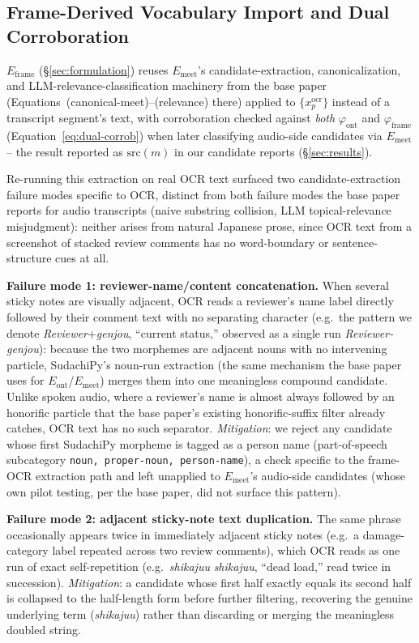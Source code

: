 ﻿\documentclass[twocolumn]{article}
\begin{document}
\subsection{Frame-Derived Vocabulary Import and Dual Corroboration}
\label{sec:method-frame-import}

$E_{\text{frame}}$ (\S\ref{sec:formulation}) reuses $E_{\text{meet}}$'s candidate-extraction,
canonicalization, and LLM-relevance-classification machinery from the base paper
(Equations~(canonical-meet)--(relevance) there) applied to $\{x^{\text{ocr}}_p\}$ instead of a
transcript segment's text, with corroboration checked against \emph{both} $\varphi_{\text{ont}}$ and
$\varphi_{\text{frame}}$ (Equation~\ref{eq:dual-corrob}) when later classifying audio-side
candidates via $E_{\text{meet}}$ -- the result reported as $\mathrm{src}(m)$ in our candidate
reports (\S\ref{sec:results}).

Re-running this extraction on real OCR text surfaced two candidate-extraction failure modes
specific to OCR, distinct from both failure modes the base paper reports for
audio transcripts (naive substring collision, LLM topical-relevance misjudgment): neither arises
from natural Japanese prose, since OCR text from a screenshot of stacked review comments has no
word-boundary or sentence-structure cues at all.

\textbf{Failure mode 1: reviewer-name/content concatenation.} When several sticky notes are
visually adjacent, OCR reads a reviewer's name label directly followed by their comment text with
no separating character (e.g.\ the pattern we denote \textit{Reviewer}+\textit{genjou}, ``current
status,'' observed as a single run \textit{Reviewer-genjou}): because the two morphemes are
adjacent nouns with no intervening particle, SudachiPy's noun-run extraction (the same mechanism the
base paper uses for $E_{\text{ont}}$/$E_{\text{meet}}$) merges them into one meaningless compound
candidate. Unlike spoken audio, where a reviewer's name is almost always followed by an honorific
particle that the base paper's existing honorific-suffix filter already catches, OCR text has no
such separator. \emph{Mitigation}: we reject any candidate whose first SudachiPy morpheme is
tagged as a person name (part-of-speech subcategory \texttt{noun, proper-noun, person-name}), a
check specific to the frame-OCR extraction path and left unapplied to $E_{\text{meet}}$'s
audio-side candidates (whose own pilot testing, per the base paper, did not surface this pattern).

\textbf{Failure mode 2: adjacent sticky-note text duplication.} The same phrase occasionally
appears twice in immediately adjacent sticky notes (e.g.\ a damage-category label repeated across
two review comments), which OCR reads as one run of exact self-repetition (e.g.\ \textit{shikajuu}
\textit{shikajuu}, ``dead load,'' read twice in succession). \emph{Mitigation}: a candidate whose
first half exactly equals its second half is collapsed to the half-length form before further
filtering, recovering the genuine underlying term (\textit{shikajuu}) rather than discarding or
merging the meaningless doubled string.
\end{document}
